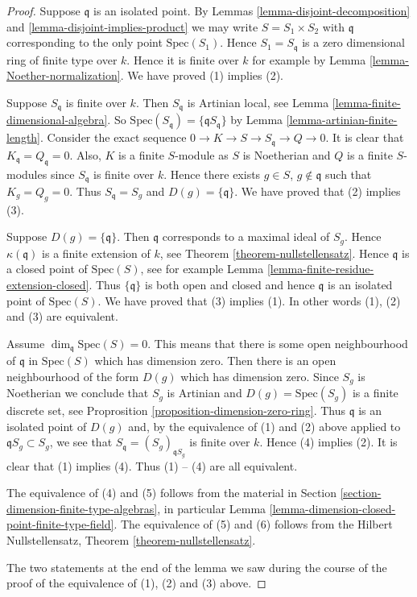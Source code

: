 \begin{proof}
Suppose $\mathfrak q$ is an isolated point.
By Lemmas \ref{lemma-disjoint-decomposition} and
\ref{lemma-disjoint-implies-product} we may
write $S = S_1 \times S_2$ with $\mathfrak q$
corresponding to the only point $\text{Spec}(S_1)$.
Hence $S_1 = S_{\mathfrak q}$ is a zero dimensional
ring of finite type over $k$. Hence it is finite over $k$
for example by Lemma \ref{lemma-Noether-normalization}.
We have proved (1) implies (2).

\medskip\noindent
Suppose $S_{\mathfrak q}$ is finite over $k$.
Then $S_{\mathfrak q}$ is Artinian local, see
Lemma \ref{lemma-finite-dimensional-algebra}. So
$\text{Spec}(S_{\mathfrak q}) = \{\mathfrak qS_{\mathfrak q}\}$ by
Lemma \ref{lemma-artinian-finite-length}.
Consider the exact sequence $0 \to K \to S \to S_{\mathfrak q}
\to Q \to 0$. It is clear that $K_{\mathfrak q} = Q_{\mathfrak q} = 0$.
Also, $K$ is a finite $S$-module as $S$ is Noetherian and
$Q$ is a finite $S$-modules since $S_{\mathfrak q}$ is finite over $k$.
Hence there exists $g \in S$, $g \not \in \mathfrak q$ such that
$K_g = Q_g = 0$. Thus $S_{\mathfrak q} = S_g$ and
$D(g) = \{ \mathfrak q \}$. We have proved that (2) implies (3).

\medskip\noindent
Suppose $D(g) =  \{ \mathfrak q \}$.
Then $\mathfrak q$ corresponds to a maximal ideal
of $S_g$. Hence $\kappa(\mathfrak q)$ is a finite
extension of $k$, see Theorem \ref{theorem-nullstellensatz}.
Hence $\mathfrak q$ is a closed point of $\text{Spec}(S)$,
see for example Lemma \ref{lemma-finite-residue-extension-closed}.
Thus $\{ \mathfrak q \}$ is both open and closed and
hence $\mathfrak q$ is an isolated point of
$\text{Spec}(S)$. We have proved that (3) implies (1).
In other words (1), (2) and (3) are equivalent.

\medskip\noindent
Assume $\dim_{\mathfrak q} \text{Spec}(S) = 0$. This means that
there is some open neighbourhood of $\mathfrak q$ in $\text{Spec}(S)$
which has dimension zero. Then there is an open neighbourhood of the
form $D(g)$ which has dimension zero. Since $S_g$ is Noetherian
we conclude that $S_g$ is Artinian and
$D(g) = \text{Spec}(S_g)$ is a finite discrete set, see
Proprosition \ref{proposition-dimension-zero-ring}.
Thus $\mathfrak q$ is an isolated point of $D(g)$ and,
by the equivalence of (1) and (2) above applied to
$\mathfrak qS_g \subset S_g$, we see that
$S_{\mathfrak q} = (S_g)_{\mathfrak qS_g}$ is finite over $k$.
Hence (4) implies (2). It is clear that (1) implies (4).
Thus (1) -- (4) are all equivalent.

\medskip\noindent
The equivalence of (4) and (5) follows from the material in
Section \ref{section-dimension-finite-type-algebras}, in particular
Lemma \ref{lemma-dimension-closed-point-finite-type-field}.
The equivalence of (5) and (6) follows from the Hilbert Nullstellensatz,
Theorem \ref{theorem-nullstellensatz}.

\medskip\noindent
The two statements at the end of the lemma we saw during the
course of the proof of the equivalence of (1), (2) and (3) above.
\end{proof}

